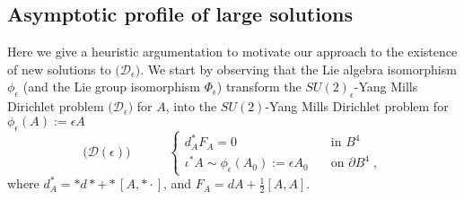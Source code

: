 \documentclass[11pt]{article}
\numberwithin{equation}{section} \setlength{\topmargin}{-35pt}
\begin{document}
\subsection{Asymptotic profile of large solutions}

Here we give a heuristic argumentation to motivate our approach to
the existence of new solutions to
$\bigl(\mathcal{D}_\epsilon\bigr)$. We start by observing that the
Lie algebra isomorphism $\phi_{\epsilon}$ (and the Lie group
isomorphism $\Phi_{\epsilon}$) transform the $SU(2)_\epsilon$-Yang
Mills Dirichlet problem $\bigl(\mathcal{D}_{\epsilon}\bigr)$ for
$A$, into the $SU(2)$-Yang Mills Dirichlet problem for
$\phi_{\epsilon}(A):=\epsilon A$
\begin{equation}
\label{transformed}
\bigl(\mathcal{D}(\epsilon)\bigr)\qquad\quad\left\{\begin{array}{ll}
d_A^{\ast}F_A=0\quad&\mbox{in } B^4\\
\iota^{\ast}A\sim \phi_{\epsilon}(A_0):=\epsilon A_0\quad&\mbox{on }
\partial B^4\;,
\end{array}\right.
\end{equation}
where $d_A^{\ast}=\ast d\ast+\ast[A,\ast\cdot]$, and
$F_A=dA+\frac{1}{2}[A,A]$.
\end{document}

